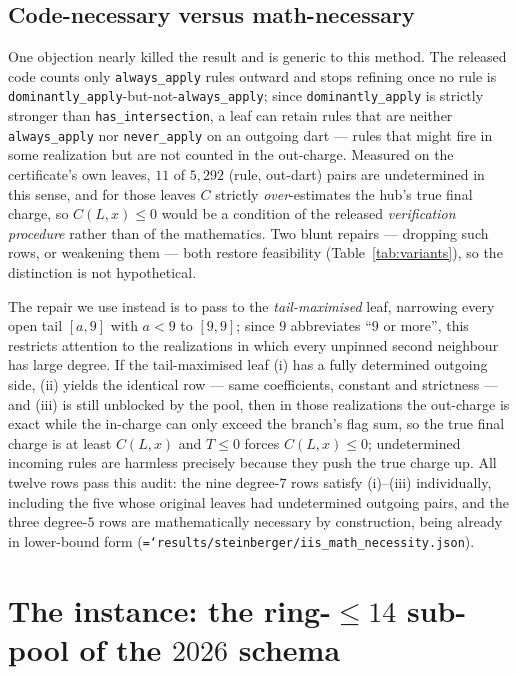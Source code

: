 \documentclass[11pt]{article}
\theoremstyle{definition}
\newcommand{\art}[1]{{\texttt{\hyphenchar\font=`\-\relax #1}}}
\begin{document}
\subsection{Code-necessary versus math-necessary}
\label{sec:necessity}

One objection nearly killed the result and is generic to this method. The
released code counts only \texttt{always\_apply} rules outward and stops refining
once no rule is \texttt{dominantly\_apply}-but-not-\texttt{always\_apply}; since
\texttt{dominantly\_apply} is strictly stronger than \texttt{has\_intersection},
a leaf can retain rules that are neither \texttt{always\_apply} nor
\texttt{never\_apply} on an outgoing dart --- rules that might fire in some
realization but are not counted in the out-charge. Measured on the certificate's
own leaves, $11$ of $5{,}292$ (rule, out-dart) pairs are undetermined in this
sense, and for those leaves $C$ strictly \emph{over}-estimates the hub's true
final charge, so $C(L,x)\le0$ would be a condition of the released
\emph{verification procedure} rather than of the mathematics. Two blunt repairs
--- dropping such rows, or weakening them --- both restore feasibility
(Table~\ref{tab:variants}), so the distinction is not hypothetical.

The repair we use instead is to pass to the \emph{tail-maximised} leaf, narrowing
every open tail $[a,9]$ with $a<9$ to $[9,9]$; since $9$ abbreviates ``$9$ or
more'', this restricts attention to the realizations in which every unpinned
second neighbour has large degree. If the tail-maximised leaf (i) has a fully
determined outgoing side, (ii) yields the identical row --- same coefficients,
constant and strictness --- and (iii) is still unblocked by the pool, then in
those realizations the out-charge is exact while the in-charge can only exceed
the branch's flag sum, so the true final charge is at least $C(L,x)$ and
$T\le0$ forces $C(L,x)\le0$; undetermined incoming rules are harmless precisely
because they push the true charge up. All twelve rows pass this audit: the nine
degree-$7$ rows satisfy (i)--(iii) individually, including the five whose
original leaves had undetermined outgoing pairs, and the three degree-$5$ rows
are mathematically necessary by construction, being already in lower-bound form
(\art{results/steinberger/iis\_math\_necessity.json}).
\section{The instance: the ring-$\le14$ sub-pool of the $2026$ schema}
\label{sec:thm}
\end{document}

